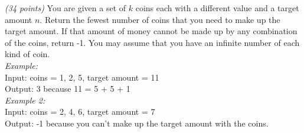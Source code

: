 \documentclass{article}
\newcounter{ProblemCounter}
\newenvironment{problem}[1][Problem]{
 \begin{trivlist}
 \item[\hskip \labelsep {\bfseries #1}\hskip \labelsep {%
 \bfseries \theProblemCounter.%
 \stepcounter{ProblemCounter}%
 }]
}{
 \end{trivlist}
}
\begin{document}
\pagebreak

\begin{problem}\textit{(34 points)}
You are given a set of $k$ coins each with a different value and a target amount $n$. Return the fewest number of coins that you need to make up the target amount. If that amount of money cannot be made up by any combination of the coins, return -1. You may assume that you have an infinite number of each kind of coin.\ \\

\noindent \textit{Example:}\\
Input: coins = {1, 2, 5}, target amount = 11\\
Output: 3 because 11 = 5 + 5 + 1\\

\noindent \textit{Example 2:}\\
Input: coins = {2, 4, 6}, target amount = 7\\
Output: -1 because you can't make up the target amount with the coins.\\


\end{problem}
\end{document}
